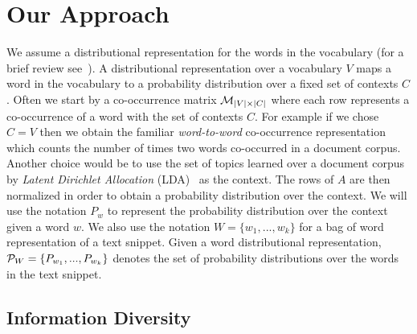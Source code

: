 \documentclass{article} %
\begin{document}

\section{Our Approach}
\label{sec:our-approach}


We assume a distributional representation for the words in the vocabulary (for a brief review
see~\cite{Turian10wordrepresentations}). A distributional representation over a vocabulary $V$ maps a word in the vocabulary to a 
probability distribution over a fixed set of contexts $C$. Often we start by a co-occurrence matrix ${\mathcal M}_{|V|\times|C|}$ where each row represents a co-occurrence of a word with the set of contexts
$C$. For example if we chose $C=V$ then we obtain the familiar {\sl word-to-word} co-occurrence representation which counts the number
of times two words co-occurred in a document corpus. Another choice would be to use the set of topics learned over a document
corpus by {\sl Latent Dirichlet Allocation} (LDA)~\cite{Blei:2003:LDA:944919.944937} as the context. The rows of $A$
are then normalized in order to obtain a probability distribution over the context. We will use the notation $P_w$ to represent
the probability distribution over the context  given a word $w$. We also use the notation $W=\{w_1,...,w_k\}$ for a bag of word representation of a text snippet. Given a word distributional representation, ${\mathcal P}_{W}=\{P_{w_1},...,P_{w_k}\}$ denotes the set of probability distributions over the words
in the text snippet.


\subsection{Information Diversity}
\label{sec:information-diversity}
\end{document}
